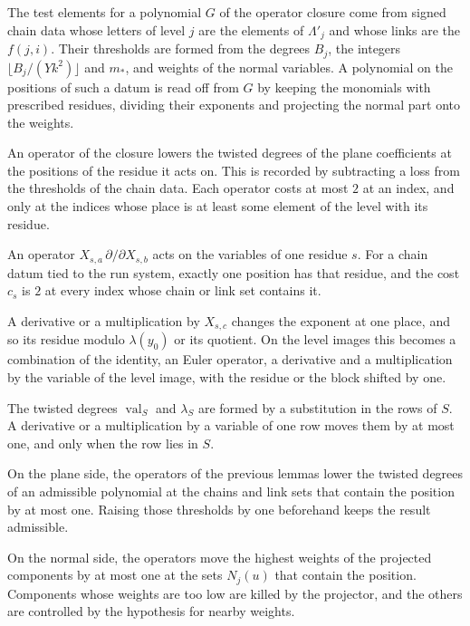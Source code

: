 The test elements for a polynomial $G$ of the operator closure come from signed chain data whose letters of level $j$
are the elements of $\Lambda'_j$ and whose links are the $f(j,i)$. Their thresholds are formed from the degrees $B_j$,
the integers $\lfloor B_j/(Yk^2)\rfloor$ and $m_*$, and weights of the normal variables. A polynomial on the positions of
such a datum is read off from $G$ by keeping the monomials with prescribed residues, dividing their exponents and
projecting the normal part onto the weights.

An operator of the closure lowers the twisted degrees of the plane coefficients at the positions of the residue it
acts on. This is recorded by subtracting a loss from the thresholds of the chain data. Each operator costs at most $2$
at an index, and only at the indices whose place is at least some element of the level with its residue.

An operator $X_{s,a}\,\partial/\partial X_{s,b}$ acts on the variables of one residue $s$. For a chain datum tied to the
run system, exactly one position has that residue, and the cost $c_s$ is $2$ at every index whose chain or link set
contains it.

A derivative or a multiplication by $X_{s,c}$ changes the exponent at one place, and so its residue modulo $\lambda(y_0)$
or its quotient. On the level images this becomes a combination of the identity, an Euler operator, a derivative and a
multiplication by the variable of the level image, with the residue or the block shifted by one.

The twisted degrees $\operatorname{val}_S$ and $\lambda_S$ are formed by a substitution in the rows of $S$. A derivative
or a multiplication by a variable of one row moves them by at most one, and only when the row lies in $S$.

On the plane side, the operators of the previous lemmas lower the twisted degrees of an admissible polynomial at the
chains and link sets that contain the position by at most one. Raising those thresholds by one beforehand keeps the
result admissible.

On the normal side, the operators move the highest weights of the projected components by at most one at the sets
$N_j(u)$ that contain the position. Components whose weights are too low are killed by the projector, and the others are
controlled by the hypothesis for nearby weights.

